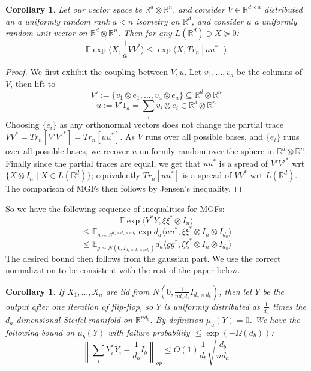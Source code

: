 \documentclass{article}
\newtheorem{corollary}[theorem]{Corollary}
\newcommand{\R}{{\mathbb{R}}}
\newcommand{\E}{\mathbb{E}}
\begin{document}
\begin{corollary}
Let our vector space be $\R^{d} \otimes \R^{n}$, and consider $V \in \R^{d \times a}$ distributed an a uniformly random rank $a < n$ isometry on $\R^{d}$, and consider $u$ a uniformly random unit vector on $\R^{d} \otimes \R^{n}$. Then for any $L(\R^{d}) \ni X \succeq 0$:
\[ \E \exp \langle X, \frac{1}{a} V V^{*} \rangle \leq \exp \langle X, Tr_{n}[u u^{*}] \rangle      \]
\end{corollary}
\begin{proof}
We first exhibit the coupling between $V,u$. Let $v_{1}, ..., v_{a}$ be the columns of $V$, then lift to
\[ V' := \{v_{1} \otimes e_{1}, ..., v_{a} \otimes e_{a} \} \subseteq \R^{d} \otimes \R^{n}     \]
\[ u := V' 1_{a} = \sum_{i} v_{i} \otimes e_{i} \in \R^{d} \otimes \R^{n}      \]
Choosing $\{e_{i}\}$ as any orthonormal vectors does not change the partial trace $V V^{*} = Tr_{n} [V' V'^{*}] = Tr_{n}[ u u^{*} ]$. As $V$ runs over all possible bases, and $\{e_{i}\}$ runs over all possible bases, we recover $u$ uniformly random over the sphere in $\R^{d} \otimes \R^{n}$. Finally since the partial traces are equal, we get that $u u^{*}$ is a spread of $V' V'^{*}$ wrt $\{X \otimes I_{n} \mid X \in L(\R^{d}) \}$; equivalently $Tr_{n}[u u^{*}]$ is a spread of $V V^{*}$ wrt $L(\R^{d})$. The comparison of MGFs then follows by Jensen's inequality. 
\end{proof}

So we have the following sequence of inequalities for MGFs:
\[ \E \exp \langle Y^{*} Y, \xi \xi^{*} \otimes I_{n} \rangle \]
\[ \leq \E_{u \sim S^{d_{a} \times d_{a} \times n d_{b}}} \exp d_{a} \langle u u^{*}, \xi \xi^{*} \otimes I_{n} \otimes I_{d_{a}} \rangle \]
\[ \leq \E _{g \sim N(0,I_{d_{a} \times d_{a} \times n d_{b}})} d_{a}  \langle g g^{*}, \xi \xi^{*} \otimes I_{n} \otimes I_{d_{a}} \rangle       \]
The desired bound then follows from the gaussian part. We use the correct normalization to be consistent with the rest of the paper below. 

\begin{corollary}
If $X_{1}, ..., X_{n}$ are iid from $N(0, \frac{1}{n d_{a} d_{b}} I_{d_{a} \times d_{b}})$, then let $Y$ be the output after one iteration of flip-flop, so $Y$ is uniformly distributed as $\frac{1}{d_{a}}$ times the $d_{a}$-dimensional Steifel manifold on $\R^{n d_{b}}$. By definition $\mu_{a}(Y) = 0$. We have the following bound on $\mu_{b}(Y)$ with failure probability $\leq \exp(- \Omega(d_{b}))$:
\[ \left\| \sum_{i} Y_{i}^{*} Y_{i} - \frac{1}{d_{b}} I_{b}    \right\|_{op} \leq O(1) \frac{1}{d_{b}} \sqrt{ \frac{d_{b}}{n d_{a}}}   \]
\end{corollary}
\end{document}
